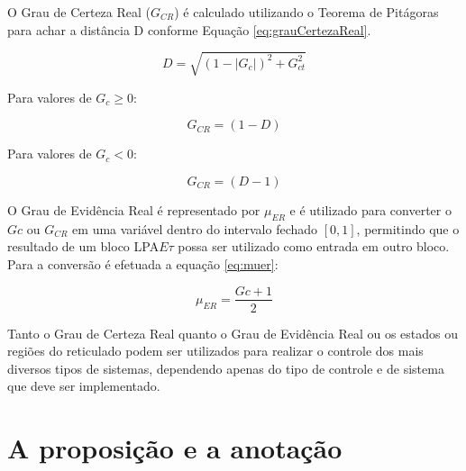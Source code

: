 O Grau de Certeza Real ($G_{CR}$) 
é calculado utilizando o Teorema de Pitágoras para achar a distância D 
conforme Equação \ref{eq:grauCertezaReal}. 

\begin{center}
\begin{equation}
D = \sqrt{(1-|G_c|)^2+G_{ct}^2}
\label{eq:grauCertezaReal}
\end{equation}
\end{center}

Para valores de $G_c \geq 0$: 

\begin{center}
\begin{equation}
G_{CR} = (1-D)
\end{equation}
\end{center}

Para valores de $G_c < 0$:

\begin{center}
\begin{equation}
G_{CR} = (D-1)
\end{equation}
\end{center}


O Grau de Evidência Real é representado por $\mu_{ER}$ 
e é utilizado para converter o $Gc$ ou $G_{CR}$ 
em uma variável dentro do intervalo fechado $[0,1]$, 
permitindo que o resultado de um bloco LPA$E\tau$ 
possa ser utilizado como entrada em outro bloco. 
Para a conversão é efetuada a equação \ref{eq:muer}:

\begin{equation}
\mu_{ER} = \frac{Gc + 1}{2}
\label{eq:muer}
\end{equation}


Tanto o Grau de Certeza Real quanto o Grau de Evidência Real 
ou os estados ou regiões do reticulado 
podem ser utilizados para realizar o controle dos mais diversos tipos de sistemas, 
dependendo apenas do tipo de controle e de sistema que deve ser implementado. 











\section{A proposição e a anotação}

